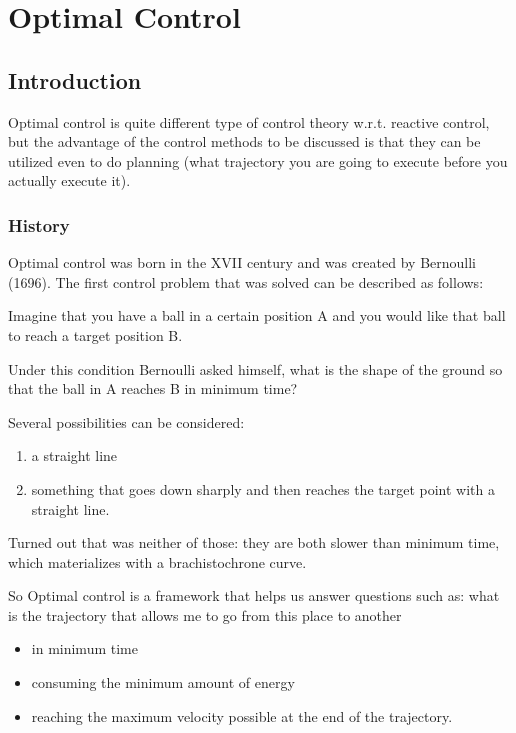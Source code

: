 \chapter{Optimal Control}

\section{Introduction}

Optimal control is quite different type of control theory w.r.t. reactive control, but the advantage of the control methods to be discussed is that they can be utilized even to do planning (what trajectory you are going to execute before you actually execute it).

\subsection{History}

Optimal control was born in the XVII century and was created by Bernoulli (1696). The first control problem that was solved can be described as follows:

Imagine that you have a ball in a certain position A and you would like that ball to reach a target position B.

Under this condition Bernoulli asked himself, what is the shape of the ground so that the ball in A reaches B in minimum time?

Several possibilities can be considered:
\begin{enumerate} 
\item a straight line
\item something that goes down sharply and then reaches the target point with a straight line.
\end{enumerate}

Turned out that was neither of those: they are both slower than minimum time, which materializes with a brachistochrone curve.

So Optimal control is a framework that helps us answer questions such as: what is the trajectory that allows me to go from this place to another
\begin{itemize} 
\item in minimum time
\item consuming the minimum amount of energy
\item  reaching the maximum velocity possible at the end of the trajectory.
\end{itemize}

